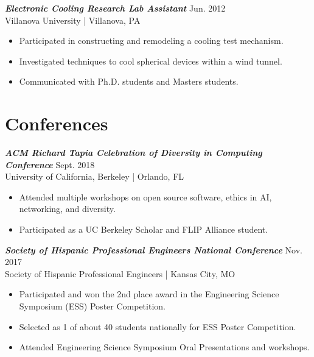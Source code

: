 \documentclass[letter]{res}
\begin{document}
\begin{resume}
\vspace{-2mm}

{\sl \textbf{Electronic Cooling Research Lab Assistant}} \hfill Jun. 2012\\
Villanova University | Villanova, PA \newline
 
 \vspace{-4mm}
 
 \begin{itemize}
 \item Participated in constructing and remodeling a cooling test mechanism.
 \item Investigated techniques to cool spherical devices within a wind tunnel.
 \item Communicated with Ph.D. students and Masters students.
 \end{itemize}
 
\vspace{-4mm}

\section{Conferences}

{\sl \textbf{ACM Richard Tapia Celebration of Diversity in Computing Conference}} \hfill Sept. 2018\\
 University of California, Berkeley | Orlando, FL \newline

 \vspace{-4mm}

 \begin{itemize}
 \item Attended multiple workshops on open source software, ethics in AI, networking, and diversity.
 \item Participated as a UC Berkeley Scholar and FLIP Alliance student.
 \end{itemize}
 
\vspace{-2mm}

{\sl \textbf{Society of Hispanic Professional Engineers National Conference}} \hfill Nov. 2017\\
 Society of Hispanic Professional Engineers | Kansas City, MO \newline

 \vspace{-4mm}

 \begin{itemize}
 \item Participated and won the 2nd place award in the Engineering Science Symposium (ESS) Poster Competition.
 \item Selected as 1 of about 40 students nationally for ESS Poster Competition.
 \item Attended Engineering Science Symposium Oral Presentations and workshops.
 \end{itemize}
 

\end{resume}
\end{document}
